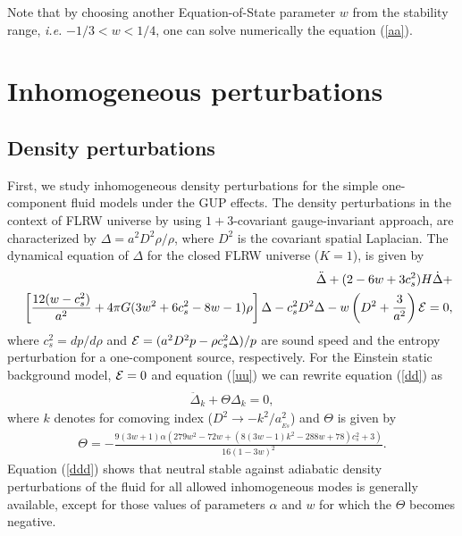 \documentclass[showpacs,amsmath,nofootinbib,amssymb,epsfig]{revtex4}
\begin{document}
Note that by choosing another Equation-of-State parameter $w$ from the stability range, {\it i.e.} $-1/3<w<1/4$, one can solve numerically the equation (\ref{aa}).
\section{Inhomogeneous perturbations}
\subsection{Density perturbations}

First, we study inhomogeneous density perturbations for the simple one-component fluid models under the GUP effects.
The density perturbations in the context of FLRW universe by using $1+3$-covariant gauge-invariant approach, are characterized by $\Delta= a^{2}D^{2}\rho/\rho$, where $D^{2}$ is the covariant spatial Laplacian.
The dynamical equation of $\Delta$ for the closed FLRW universe ($K=1$), is given by \cite{Barrow,Bruni}
\begin{eqnarray}\label{dd}
&&\ddot{\Delta}+(2-6w+3c_{s}^{2})H\dot{\Delta}+\\\nonumber&&\left[\frac{12(w-c_{s}^{2})}{a^{2}}+4\pi G(3w^{2}+6c_{s}^{2}-8w-1)\rho\right]\Delta-c_{s}^{2}D^{2}\Delta-w\left(D^{2}+\frac{3}{a^{2}}\right){\cal E}=0,
\end{eqnarray}
where $c_s^2=dp/d\rho$ and ${\cal E}=(a^{2}D^{2}p-\rho c_{s}^{2}\Delta)/p$ are sound speed and the entropy perturbation for a one-component source, respectively.  For the Einstein static background model, ${\cal E} = 0$ and equation (\ref{uu}) we can rewrite equation (\ref{dd}) as
\begin{eqnarray}\label{ddd}
\\\nonumber\ddot{\Delta}_{k}+\Theta{\Delta}_{k}=0,
\end{eqnarray}
where $k$ denotes for comoving index ($D^2\rightarrow -k^2/a^2_{_{Es}}$) and $\Theta$ is given by
\begin{eqnarray}\label{dddd}
\Theta=-\frac{9 (3 w+1) \alpha  \left(279 w^2-72 w+\left(8 (3 w-1) k^2-288 w+78\right) c_s^2+3\right)}{16 (1-3
   w)^2}.
\end{eqnarray}
Equation (\ref{ddd}) shows that neutral stable against adiabatic density perturbations of the fluid for all
allowed inhomogeneous modes is generally available, except for those values of parameters $\alpha$ and $w$ for which the $\Theta$ becomes negative.
\end{document}
